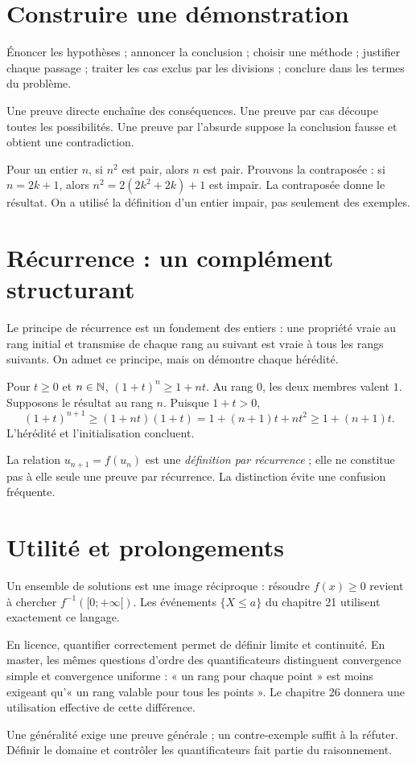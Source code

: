 \documentclass[../cours_1re.tex]{subfiles}
\begin{document}
\section{Construire une démonstration}
\begin{methode}
Énoncer les hypothèses ; annoncer la conclusion ; choisir une méthode ; justifier chaque passage ; traiter les cas exclus par les divisions ; conclure dans les termes du problème.
\end{methode}
Une preuve directe enchaîne des conséquences. Une preuve par cas découpe toutes les possibilités. Une preuve par l'absurde suppose la conclusion fausse et obtient une contradiction.
\begin{demonstration}
Pour un entier $n$, si $n^2$ est pair, alors $n$ est pair. Prouvons la contraposée : si $n=2k+1$, alors $n^2=2(2k^2+2k)+1$ est impair. La contraposée donne le résultat. On a utilisé la définition d'un entier impair, pas seulement des exemples.
\end{demonstration}
\begin{finchapitre}
\section{Récurrence : un complément structurant}
\approfondissement Le principe de récurrence est un fondement des entiers : une propriété vraie au rang initial et transmise de chaque rang au suivant est vraie à tous les rangs suivants. On admet ce principe, mais on démontre chaque hérédité.
\begin{demonstration}
Pour $t\ge0$ et $n\in\mathbb{N}$, $(1+t)^n\ge1+nt$.
Au rang $0$, les deux membres valent $1$. Supposons le résultat au rang $n$. Puisque $1+t>0$,
\[
(1+t)^{n+1}\ge(1+nt)(1+t)=1+(n+1)t+nt^2\ge1+(n+1)t.
\]
L'hérédité et l'initialisation concluent.
\end{demonstration}
La relation $u_{n+1}=f(u_n)$ est une \emph{définition par récurrence} ; elle ne constitue pas à elle seule une preuve par récurrence. La distinction évite une confusion fréquente.


\section{Utilité et prolongements}
Un ensemble de solutions est une image réciproque : résoudre $f(x)\ge0$ revient à chercher $f^{-1}([0;+\infty[)$. Les événements $\{X\le a\}$ du chapitre 21 utilisent exactement ce langage.

En licence, quantifier correctement permet de définir limite et continuité. En master, les mêmes questions d'ordre des quantificateurs distinguent convergence simple et convergence uniforme : « un rang pour chaque point » est moins exigeant qu'« un rang valable pour tous les points ». Le chapitre 26 donnera une utilisation effective de cette différence.
\begin{retenir}
Une généralité exige une preuve générale ; un contre-exemple suffit à la réfuter. Définir le domaine et contrôler les quantificateurs fait partie du raisonnement.
\end{retenir}
\end{finchapitre}
\end{document}
